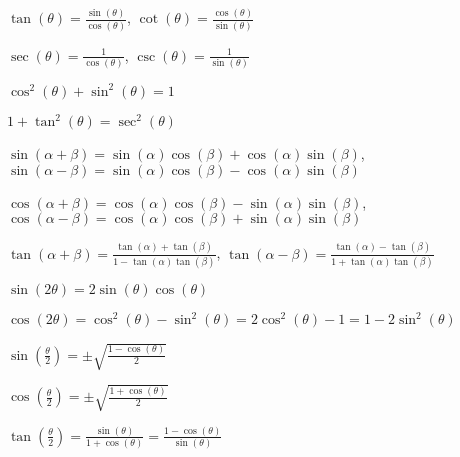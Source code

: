\documentclass{ximera}
\begin{document}
$\tan(\theta)=\frac{\sin(\theta)}{\cos(\theta)}$, $\cot(\theta)=\frac{\cos(\theta)}{\sin(\theta)}$

$\sec(\theta)=\frac{1}{\cos(\theta)}$, $\csc(\theta)=\frac{1}{\sin(\theta)}$

$\cos^2(\theta)+\sin^2(\theta)=1$

$1+\tan^2(\theta)=\sec^2(\theta)$

$\sin(\alpha+\beta)=\sin(\alpha)\cos(\beta)+\cos(\alpha)\sin(\beta)$,  $\sin(\alpha-\beta)=\sin(\alpha)\cos(\beta)-\cos(\alpha)\sin(\beta)$

$\cos(\alpha+\beta)=\cos(\alpha)\cos(\beta)-\sin(\alpha)\sin(\beta)$, $\cos(\alpha-\beta)=\cos(\alpha)\cos(\beta)+\sin(\alpha)\sin(\beta)$

$\tan(\alpha+\beta)=\frac{\tan(\alpha)+\tan(\beta)}{1-\tan(\alpha)\tan(\beta)}$, $\tan(\alpha-\beta)=\frac{\tan(\alpha)-\tan(\beta)}{1+\tan(\alpha)\tan(\beta)}$

$\sin(2\theta)=2\sin(\theta)\cos(\theta)$

$\cos(2\theta)=\cos^2(\theta)-\sin^2(\theta) = 2\cos^2(\theta)-1 = 1-2\sin^2(\theta)$

$\sin(\frac{\theta}{2})=\pm\sqrt{\frac{1-\cos(\theta)}{2}}$

$\cos(\frac{\theta}{2})=\pm\sqrt{\frac{1+\cos(\theta)}{2}}$

$\tan(\frac{\theta}{2})=\frac{\sin(\theta)}{1+\cos(\theta)}=\frac{1-\cos(\theta)}{\sin(\theta)}$
\end{document}
